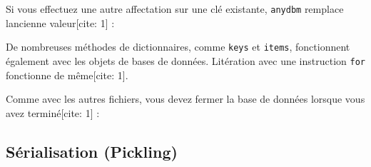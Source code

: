 \begin{Shaded}
\begin{Highlighting}[]
\OperatorTok{\textgreater{}\textgreater{}\textgreater{}} \NormalTok{ db[}\NormalTok{]}
\end{Highlighting}
\end{Shaded}

Si vous effectuez une autre affectation sur une clé existante,
\texttt{anydbm} remplace l\textquotesingle ancienne valeur{[}cite: 1{]}
:

\begin{Shaded}
\begin{Highlighting}[]
\OperatorTok{\textgreater{}\textgreater{}\textgreater{}}\NormalTok{ db[}\NormalTok{] }\OperatorTok{=} 
\OperatorTok{\textgreater{}\textgreater{}\textgreater{}} \NormalTok{ db[}\NormalTok{]}
\end{Highlighting}
\end{Shaded}

De nombreuses méthodes de dictionnaires, comme \texttt{keys} et
\texttt{items}, fonctionnent également avec les objets de bases de
données. L\textquotesingle itération avec une instruction \texttt{for}
fonctionne de même{[}cite: 1{]}.

\begin{Shaded}
\begin{Highlighting}[]
\end{Highlighting}
\end{Shaded}

Comme avec les autres fichiers, vous devez fermer la base de données
lorsque vous avez terminé{[}cite: 1{]} :

\begin{Shaded}
\begin{Highlighting}[]
\OperatorTok{\textgreater{}\textgreater{}\textgreater{}}
\end{Highlighting}
\end{Shaded}

\hypertarget{suxe9rialisation-pickling}{%
\subsection{Sérialisation (Pickling)}\label{suxe9rialisation-pickling}}


